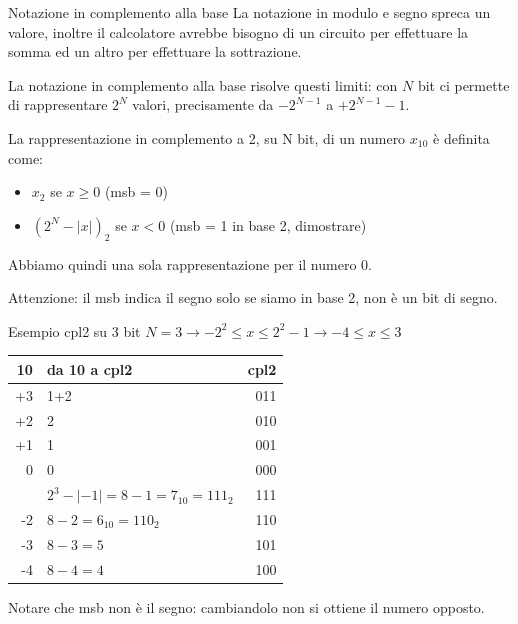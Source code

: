 \documentclass[aspectratio=169]{beamer}
\begin{document}
\begin{frame}{Notazione in complemento alla base}
La notazione in modulo e segno spreca un valore, inoltre il calcolatore avrebbe bisogno di un circuito per effettuare la somma ed un altro per effettuare la sottrazione.

La \alert{notazione in complemento alla base} risolve questi limiti: con $N$ bit ci permette di rappresentare $2^N$ valori, precisamente da $-2^{N-1}$ a $+2^{N-1}-1$.

\pause

La rappresentazione in complemento a 2, su N bit, di un numero $x_{10}$ è definita come:
\begin{itemize}
	\item $x_2$ se $x \geq 0$ (msb = 0)
	\item $(2^N-|x|)_2$ se $x < 0$ (msb = 1 in base 2, dimostrare)
\end{itemize}

\pause

Abbiamo quindi una sola rappresentazione per il numero 0.

Attenzione: il msb indica il segno solo se siamo in base 2, \alert{non è un bit di segno}.
\end{frame}



\begin{frame}{Esempio cpl2 su 3 bit}
$N=3 \rightarrow -2^2 \leq x \leq 2^2-1 \rightarrow -4 \leq x \leq 3$
\pause

\begin{tabular}{r|l|r}
	10	&	da 10 a cpl2	&	cpl2 \\
	\hline
	+3&	1+2	&	011\\
	+2& 2	&	010\\
	+1& 1	&	001\\
	0 & 0	&	000\\
	\pause
	-1&	$2^3-|-1| = 8-1 = 7_{10} = 111_2$& 111	\\
	-2&	$8-2 = 6_{10} = 110_2$& 110	\\
	-3&	$8-3 = 5$& 101	\\
	-4&	$8-4 = 4$& 100\\
\end{tabular}

Notare che msb \alert{non è il segno}: cambiandolo non si ottiene il numero opposto.
\end{frame}
\end{document}
